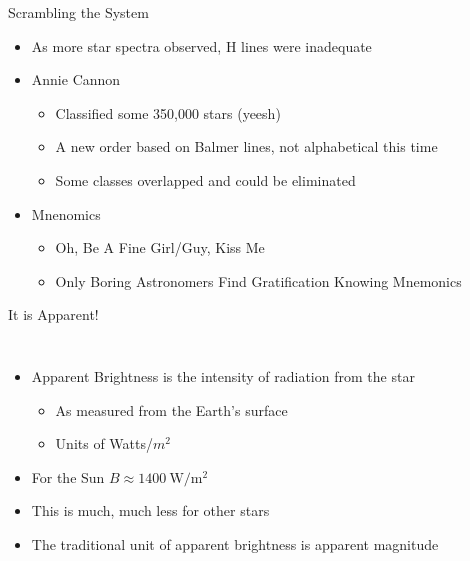 \documentclass[pdf, aspectratio=169]{beamer}
\begin{document}
\begin{frame}{Scrambling the System}
	\begin{itemize}
	  \item As more star spectra observed, H lines were inadequate
	  \item Annie Cannon
		\begin{itemize}
		  \item Classified some 350,000 stars (yeesh)
		  \item A new order based on Balmer lines, not alphabetical this time
		  \item Some classes overlapped and could be eliminated
		\end{itemize}
	  \item Mnenomics
		\begin{itemize}
		  \item Oh, Be A Fine Girl/Guy, Kiss Me
		  \item Only Boring Astronomers Find Gratification Knowing Mnemonics
		\end{itemize}
	\end{itemize}
	\begin{center}
	\end{center}
\end{frame}

\begin{frame}{It is Apparent!}
  \begin{columns}
	\begin{itemize}
	  \item Apparent Brightness is the intensity of radiation from the star
		\begin{itemize}
		  \item As measured from the Earth's surface
		  \item Units of Watts/$m^2$
		\end{itemize}
	  \item For the Sun $B\approx \SI{1400}{\watt\per\meter^2}$
	  \item This is much, much less for other stars
	  \item The traditional unit of apparent brightness is \alert{apparent magnitude}
	\end{itemize}
	\begin{center}
	\end{center}
  \end{columns}
\end{frame}
\end{document}
